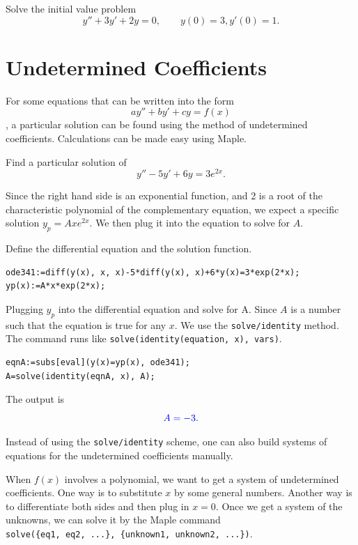 \documentclass[
  12pt]{elegantbook}
\begin{document}
\begin{exercise}
Solve the initial value problem
\[y''+3y'+2y=0,\qquad y(0)=3, y'(0)=1.\]
\end{exercise}

\hypertarget{undetermined-coefficients}{%
\section{Undetermined Coefficients}\label{undetermined-coefficients}}

For some equations that can be written into the form
\[ay''+by'+cy=f(x)\], a particular solution can be found using the method of undetermined coefficients.
Calculations can be made easy using Maple.

\begin{example}
Find a particular solution of
\[y''-5y'+6y=3e^{2x}.\]
\end{example}

\begin{solution}
Since the right hand side is an exponential function, and 2 is a root of the characteristic polynomial of the complementary equation, we expect a specific solution \(y_p=Axe^{2x}\). We then plug it into the equation to solve for \(A\).

Define the differential equation and the solution function.

\begin{verbatim}
ode341:=diff(y(x), x, x)-5*diff(y(x), x)+6*y(x)=3*exp(2*x);
yp(x):=A*x*exp(2*x);
\end{verbatim}

Plugging \(y_p\) into the differential equation and solve for A. Since \(A\) is a number such that the equation is true for any \(x\). We use the \texttt{solve/identity} method. The command runs like \texttt{solve(identity(equation,\ x),\ vars)}.

\begin{verbatim}
eqnA:=subs[eval](y(x)=yp(x), ode341);
A=solve(identity(eqnA, x), A);
\end{verbatim}

The output is
\[\color{blue}{A = -3}.\]
\end{solution}

Instead of using the \texttt{solve/identity} scheme, one can also build systems of equations for the undetermined coefficients manually.

When \(f(x)\) involves a polynomial, we want to get a system of undetermined coefficients. One way is to substitute \(x\) by some general numbers. Another way is to differentiate both sides and then plug in \(x=0\). Once we get a system of the unknowns, we can solve it by the Maple command \texttt{solve(\{eq1,\ eq2,\ ...\},\ \{unknown1,\ unknown2,\ ...\})}.
\end{document}
